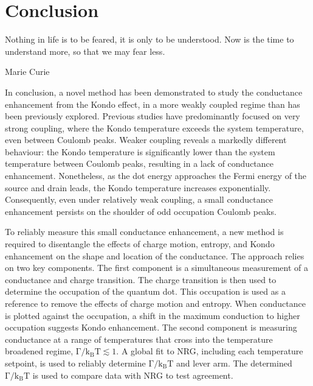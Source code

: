 \chapter{Conclusion}\label{cha:conclusion}


\epigraph{Nothing in life is to be feared, it is only to be understood. Now is the time to understand more, so that we may fear less.}{Marie Curie}

\noindent In conclusion, a novel method has been demonstrated to study the conductance enhancement from the Kondo effect, in a more weakly coupled regime than has been previously explored. 
Previous studies have predominantly focused on very strong coupling, where the Kondo temperature exceeds the system temperature, even between Coulomb peaks.
Weaker coupling reveals a markedly different behaviour: the Kondo temperature is significantly lower than the system temperature between Coulomb peaks, resulting in a lack of conductance enhancement.
Nonetheless, as the dot energy approaches the Fermi energy of the source and drain leads, the Kondo temperature increases exponentially. 
Consequently, even under relatively weak coupling, a small conductance enhancement persists on the shoulder of odd occupation Coulomb peaks.




To reliably measure this small conductance enhancement, a new method is required to disentangle the effects of charge motion, entropy, and Kondo enhancement on the shape and location of the conductance. 
The approach relies on two key components. 
The first component is a simultaneous measurement of a conductance and charge transition. The charge transition is then used to determine the occupation of the quantum dot. This occupation is used as a reference to remove the effects of charge motion and entropy. When conductance is plotted against the occupation, a shift in the maximum conduction to higher occupation suggests Kondo enhancement. 
The second component is measuring conductance at a range of temperatures that cross into the temperature broadened regime, $\mathrm{\Gamma/k_BT} \lesssim 1$. A global fit to NRG, including each temperature setpoint, is used to reliably determine $\mathrm{\Gamma/k_BT}$ and lever arm. The determined $\mathrm{\Gamma/k_BT}$ is used to compare data with NRG to test agreement. 

